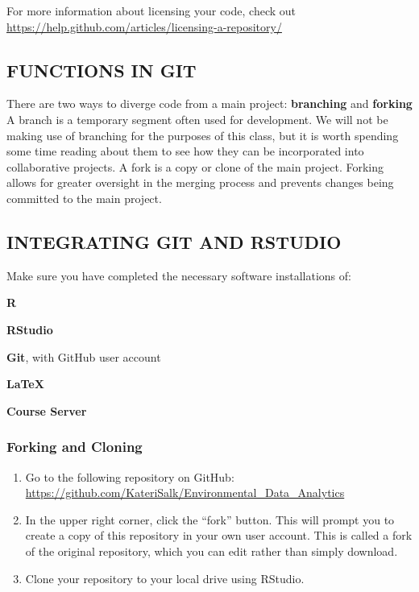 \documentclass[]{article}
\begin{document}
For more information about licensing your code, check out
\url{https://help.github.com/articles/licensing-a-repository/}

\subsection{FUNCTIONS IN GIT}\label{functions-in-git}

There are two ways to diverge code from a main project:
\textbf{branching} and \textbf{forking} A branch is a temporary segment
often used for development. We will not be making use of branching for
the purposes of this class, but it is worth spending some time reading
about them to see how they can be incorporated into collaborative
projects. A fork is a copy or clone of the main project. Forking allows
for greater oversight in the merging process and prevents changes being
committed to the main project.

\subsection{INTEGRATING GIT AND
RSTUDIO}\label{integrating-git-and-rstudio}

Make sure you have completed the necessary software installations of:

\textbf{R}

\textbf{RStudio}

\textbf{Git}, with GitHub user account

\textbf{LaTeX}

\textbf{Course Server}

\subsubsection{Forking and Cloning}\label{forking-and-cloning}

\begin{enumerate}
\def\labelenumi{\arabic{enumi}.}
\item
  Go to the following repository on GitHub:
  \url{https://github.com/KateriSalk/Environmental_Data_Analytics}
\item
  In the upper right corner, click the ``fork'' button. This will prompt
  you to create a copy of this repository in your own user account. This
  is called a fork of the original repository, which you can edit rather
  than simply download.
\item
  Clone your repository to your local drive using RStudio.
\end{enumerate}
\end{document}
